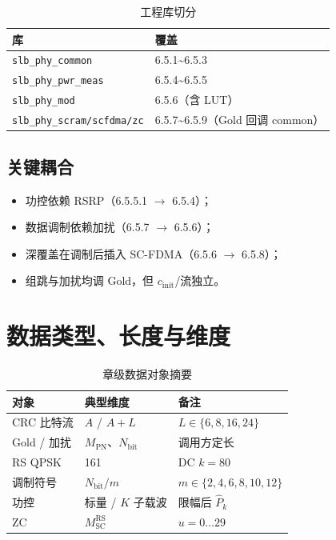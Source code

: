 \documentclass[11pt,a4paper]{ctexart}
\begin{document}
\begin{longtable}{L{4.5cm}L{9.5cm}}
\caption{工程库切分\label{tab:65-libs}} \\
\toprule
\textbf{库} & \textbf{覆盖} \\
\midrule
\texttt{slb\_phy\_common} & 6.5.1\textasciitilde 6.5.3 \\
\texttt{slb\_phy\_pwr\_meas} & 6.5.4\textasciitilde 6.5.5 \\
\texttt{slb\_phy\_mod} & 6.5.6（含 LUT） \\
\texttt{slb\_phy\_scram/scfdma/zc} & 6.5.7\textasciitilde 6.5.9（Gold 回调 common） \\
\bottomrule
\end{longtable}

\subsection{关键耦合}

\begin{itemize}[nosep]
  \item 功控依赖 RSRP（6.5.5.1 $\rightarrow$ 6.5.4）；
  \item 数据调制依赖加扰（6.5.7 $\rightarrow$ 6.5.6）；
  \item 深覆盖在调制后插入 SC-FDMA（6.5.6 $\rightarrow$ 6.5.8）；
  \item 组跳与加扰均调 Gold，但 $c_{\mathrm{init}}$/流独立。
\end{itemize}

\section{数据类型、长度与维度}

\begin{longtable}{L{3.5cm}L{4cm}L{6.5cm}}
\caption{章级数据对象摘要\label{tab:65-dim}} \\
\toprule
\textbf{对象} & \textbf{典型维度} & \textbf{备注} \\
\midrule
CRC 比特流 & $A$ / $A{+}L$ & $L\in\{6,8,16,24\}$ \\
Gold / 加扰 & $M_{\mathrm{PN}}$、$N_{\mathrm{bit}}$ & 调用方定长 \\
RS QPSK & 161 & DC $k{=}80$ \\
调制符号 & $N_{\mathrm{bit}}/m$ & $m\in\{2,4,6,8,10,12\}$ \\
功控 & 标量 / $K$ 子载波 & 限幅后 $\hat{P}_k$ \\
ZC & $M_{\mathrm{SC}}^{\mathrm{RS}}$ & $u{=}0\ldots 29$ \\
\bottomrule
\end{longtable}
\end{document}
